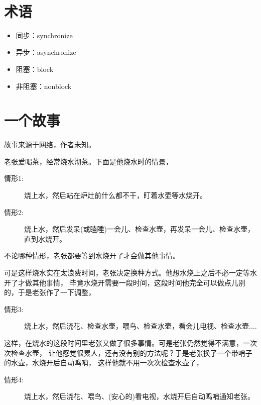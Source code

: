 \documentclass[a4paper,11pt]{article}
\begin{document}
\tt %
\pagestyle{header}
\sybmaketitle
\newpage

\pagestyle{main}
\setcounter{page}{1}

\section[术语]{术语}
\begin{itemize}
  \item 同步：synchronize
  \item 异步：asynchronize
  \item 阻塞：block
  \item 非阻塞：nonblock
\end{itemize}

\section[一个故事]{一个故事}
故事来源于网络，作者未知。

老张爱喝茶，经常烧水沏茶。下面是他烧水时的情景，
\begin{description}
  \item[情形1: ] 烧上水，然后站在炉灶前什么都不干，盯着水壶等水烧开。
  \item[情形2: ] 烧上水，然后发呆(或瞌睡)一会儿、检查水壶，再发呆一会儿、检查水壶，直到水烧开。
\end{description}
不论哪种情形，老张都要等到水烧开了才会做其他事情。

可是这样烧水实在太浪费时间，老张决定换种方式。他想水烧上之后不必一定等水开了才做其他事情，
毕竟水烧开需要一段时间，这段时间他完全可以做点儿别的，于是老张作了一下调整，
\begin{description}
  \item[情形3: ] 烧上水，然后浇花、检查水壶，喂鸟、检查水壶，看会儿电视、检查水壶....
\end{description}
这样，在烧水的这段时间里老张又做了很多事情。可是老张仍然觉得不满意，一次次检查水壶，
让他感觉很累人，还有没有别的方法呢？于是老张换了一个带哨子的水壶，水烧开后自动鸣哨，
这样他就不用一次次检查水壶了，
\begin{description}
  \item[情形4: ] 烧上水，然后浇花、喂鸟、(安心的)看电视，水烧开后自动鸣哨通知老张。
\end{description}
\end{document}
